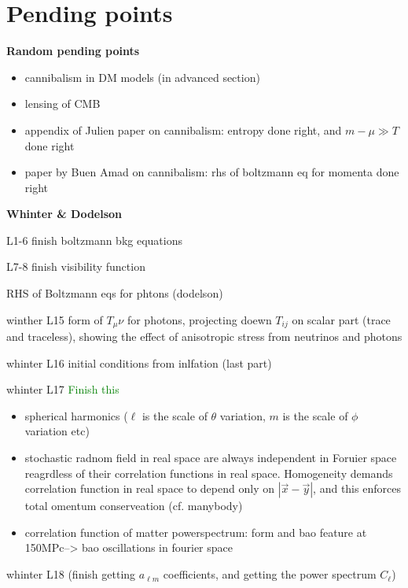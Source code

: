 \chapter*{Pending points}




\noindent
\textbf{Random pending points}
\begin{itemize}
    \item cannibalism in DM models (in advanced section)
    \item lensing of CMB
    \item appendix of Julien paper on cannibalism: entropy done right, and $m-\mu\gg T$ done right
    \item paper by Buen Amad on cannibalism: rhs of boltzmann eq for momenta done right
\end{itemize}




\noindent
\textbf{Whinter \& Dodelson}
\begin{enumerate}
    \item L1-6 {\color{red} finish boltzmann bkg equations}
    \item {\color{red} L7-8 finish visibility function}
    \item {\color{red} RHS of Boltzmann eqs for phtons (dodelson) }
    \item  {\color{red} winther L15 form of $T_\mu\nu$ for photons, projecting doewn $T_{ij}$ on scalar part (trace and traceless), showing the effect of anisotropic stress from neutrinos and photons }
    \item  {\color{red} whinter L16 initial conditions from inlfation (last part) }
    \item {\color{red} whinter L17 \textcolor{green}{Finish this}
    \begin{itemize}
        \item spherical harmonics ($\ell$ is the scale of $\theta$ variation, $m$ is the scale of $\phi$ variation etc)
        \item stochastic radnom field in real space are always independent in Foruier space reagrdless of their correlation functions in real space. Homogeneity demands correlation function in real space to depend only on $|\vec x - \vec y|$, and this enforces total omentum conserveation (cf. manybody)
        \item correlation function of matter powerspectrum: form and bao feature at 150MPc--> bao oscillations in fourier space
    \end{itemize}
    \item whinter L18 (finish getting $a_{\ell m}$ coefficients, and getting the power spectrum $C_\ell$)}
\end{enumerate}